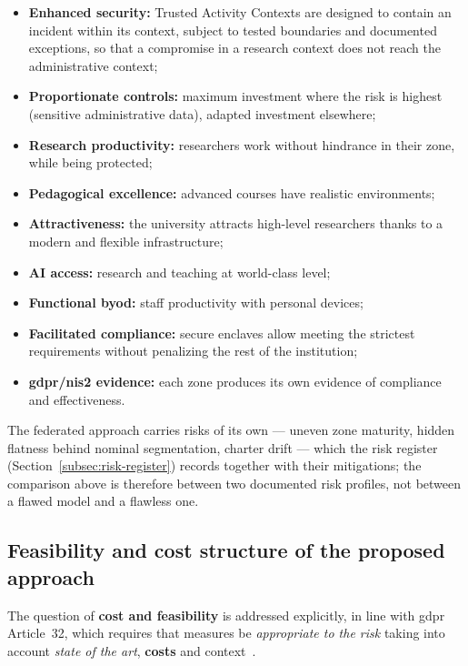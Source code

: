 \begin{itemize}
    \item \textbf{Enhanced security:} Trusted Activity Contexts are
    designed to contain an incident within its context, subject to
    tested boundaries and documented exceptions, so that a compromise
    in a research context does not reach the administrative context;
    \item \textbf{Proportionate controls:} maximum investment where
    the risk is highest (sensitive administrative data),
    adapted investment elsewhere;
    \item \textbf{Research productivity:} researchers work
    without hindrance in their zone, while being protected;
    \item \textbf{Pedagogical excellence:} advanced courses have
    realistic environments;
    \item \textbf{Attractiveness:} the university attracts high-level
    researchers thanks to a modern and flexible infrastructure;
    \item \textbf{AI access:} research and teaching at world-class level;
    \item \textbf{Functional \gls{byod}:} staff productivity with
    personal devices;
    \item \textbf{Facilitated compliance:} secure enclaves
    allow meeting the strictest requirements without
    penalizing the rest of the institution;
    \item \textbf{\gls{gdpr}/\gls{nis2} evidence:} each zone produces its own
    evidence of compliance and effectiveness.
\end{itemize}

The federated approach carries risks of its own --- uneven zone
maturity, hidden flatness behind nominal segmentation, charter drift ---
which the risk register (Section~\ref{subsec:risk-register}) records
together with their mitigations; the comparison above is therefore
between two documented risk profiles, not between a flawed model and a
flawless one.

\subsection{Feasibility and cost structure of the proposed approach}

The question of \textbf{cost and feasibility} is addressed explicitly,
in line with \gls{gdpr} Article~32, which requires that measures be
\emph{appropriate to the risk} taking into account \emph{state of the
art}, \textbf{costs} and context~\cite{gdpr}.

